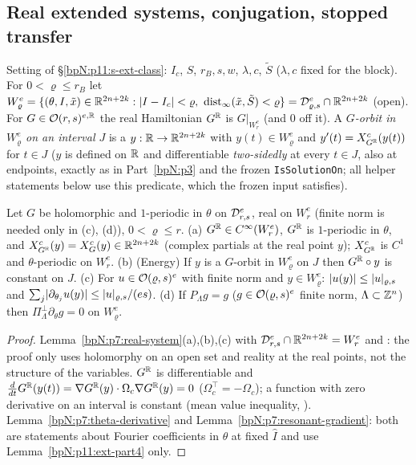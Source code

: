 \begingroup\sloppy
\subsection{Real extended systems, conjugation, stopped transfer}\label{bpN:p11:s-real}

Setting of \S\ref{bpN:p11:s-ext-class}: $I_c$, $S$, $r_B,s,w$, $\lambda,c$, $\tilde S$ ($\lambda,c$ fixed for the block). For $0<\varrho\le r_B$ let
$W^e_\varrho=\{(\theta,I,\tilde x)\in\R^{2n+2k}:\abs{I-I_c}<\varrho,\ \operatorname{dist}_\infty(\tilde x,\tilde S)<\varrho\}=\Dom\varrho s^e\cap\R^{2n+2k}$ (open). For $G\in\mathcal O(r,s)^{e,\mathbb{R}}$ the real Hamiltonian $G^{\mathbb{R}}$ is $G|_{W^e_r}$ (and $0$ off it). A \emph{$G$-orbit in $W^e_\varrho$ on an interval $J$} is a $y:\mathbb{R}\to\mathbb{R}^{2n+2k}$ with $y(t)\in W^e_\varrho$ and $y'(t)=X^c_{G^{\mathbb{R}}}(y(t))$ for $t\in J$ ($y$ is defined on $\mathbb{R}$ and differentiable \emph{two-sidedly} at every $t\in J$, also at endpoints, exactly as in Part~\ref{bpN:p3} and the frozen \texttt{IsSolutionOn}; all helper statements below use this predicate, which the frozen input satisfies).

\begin{lemma}\label{bpN:p11:real-system}
Let $G$ be holomorphic and $1$-periodic in $\theta$ on $\mathcal D_{r,s}^e$, real on $W^e_r$ (finite norm is needed only in (c), (d)), $0<\varrho\le r$.
(a) $G^{\mathbb{R}}\in C^\infty(W^e_r)$, $G^{\mathbb{R}}$ is $1$-periodic in $\theta$, and $X^c_{G^{\mathbb{R}}}(y)=X^c_G(y)\in\mathbb{R}^{2n+2k}$ (complex partials at the real point $y$); $X^c_{G^{\mathbb{R}}}$ is $C^1$ and $\theta$-periodic on $W^e_r$.
(b) (Energy) If $y$ is a $G$-orbit in $W^e_\varrho$ on $J$ then $G^{\mathbb{R}}\circ y$ is constant on $J$.
(c) For $u\in\mathcal O(\varrho,s)^e$ with finite norm and $y\in W^e_\varrho$: $\lvert u(y)\rvert\le\lvert u\rvert_{\varrho,s}$ and $\sum_j\lvert \partial_{\theta_j}u(y)\rvert\le\lvert u\rvert_{\varrho,s}/(es)$.
(d) If $P_\Lambda g=g$ ($g\in\mathcal O(\varrho,s)^e$ finite norm, $\Lambda\subset\mathbb{Z}^n$) then $\Pi_\Lambda^\perp\partial_\theta g=0$ on $W^e_\varrho$.
\end{lemma}
\begin{proof}
\label{stepN:p11:rs-a} Lemma~\ref{bpN:p7:real-system}(a),(b),(c) with $\mathcal D_{r,s}^e\cap\mathbb{R}^{2n+2k}=W^e_r$ and : the proof only uses holomorphy on an open set and reality at the real points, not the structure of the variables.
\label{stepN:p11:rs-b} $G^{\mathbb{R}}$ is differentiable and $\frac d{dt}G^{\mathbb{R}}(y(t))=\nabla G^{\mathbb{R}}(y)\cdot\Omega_c\nabla G^{\mathbb{R}}(y)=0$ ($\Omega_c^\top=-\Omega_c$); a function with zero derivative on an interval is constant (mean value inequality, ).
\label{stepN:p11:rs-cd} Lemma~\ref{bpN:p7:theta-derivative} and Lemma~\ref{bpN:p7:resonant-gradient}: both are statements about Fourier coefficients in $\theta$ at fixed $\hat I$ and use Lemma~\ref{bpN:p11:ext-part4} only.
\end{proof}

